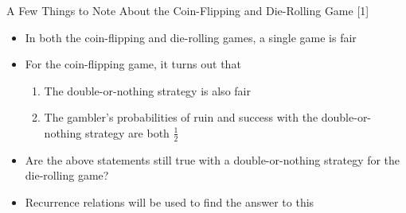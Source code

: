 \documentclass[14pt]{beamer}
\begin{document}
\begin{frame}{A Few Things to Note About the Coin-Flipping and Die-Rolling Game [1]}
 \begin{itemize}
     \item In both the coin-flipping and die-rolling games, a single game is fair
     \item For the coin-flipping game, it turns out that
          \begin{enumerate}
            \item The double-or-nothing strategy is also fair
            \item The gambler's probabilities of ruin and success with the double-or-nothing strategy are both $\frac{1}{2}$
            \end{enumerate}
     \item Are the above statements still true with a double-or-nothing strategy for the die-rolling game?
     \item Recurrence relations will be used to find the answer to this
 \end{itemize}
\end{frame}

\begin{comment}
\begin{frame}{Approach for Comparing the Double-or-Nothing Strategy for Coin-Flipping and Die-Rolling Games [1]}
 \begin{itemize}
     \item Consider the following questions:
         \item The die-rolling game is also fair when played as a single game, but is it still fair when played with a double-or-nothing strategy?
         \item Does the gambler have equal chances of being successful and being ruined with this strategy?
 \end{itemize}
\end{frame}

\begin{frame}{How Does the Die-Rolling Variation of the Gambler's Ruin Problem Compare to Classical Version? [1]}
 \begin{itemize}
     \item Consider the following questions:
         \item The die-rolling game is also fair when played as a single game, but is it still fair when played with a double-or-nothing strategy?
         \item Does the gambler have equal chances of being successful and being ruined with this strategy?
 \end{itemize}
\end{frame}
\end{comment}
\end{document}
